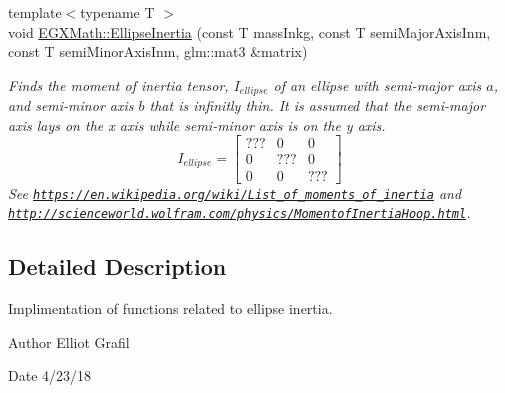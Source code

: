 \begin{DoxyCompactItemize}
{\footnotesize template$<$typename T $>$ }\\void \mbox{\hyperlink{group___e_g_x_math-_geometry-2_d-_ellipse-_inertia_gad679a65dc7550e27dc69c1d328c94732}{E\+G\+X\+Math\+::\+Ellipse\+Inertia}} (const T mass\+Inkg, const T semi\+Major\+Axis\+Inm, const T semi\+Minor\+Axis\+Inm, glm\+::mat3 \&matrix)
\begin{DoxyCompactList}\small\item\em Finds the moment of inertia tensor, $I_{ellipse}$ of an ellipse with semi-\/major axis $a$, and semi-\/minor axis $b$ that is infinitly thin. It is assumed that the semi-\/major axis lays on the x axis while semi-\/minor axis is on the y axis. \[ I_{ellipse}=\begin{bmatrix} ??? & 0 & 0\\ 0 & ??? & 0\\ 0 & 0 & ??? \end{bmatrix} \] See \href{https://en.wikipedia.org/wiki/List_of_moments_of_inertia}{\tt https\+://en.\+wikipedia.\+org/wiki/\+List\+\_\+of\+\_\+moments\+\_\+of\+\_\+inertia} and \href{http://scienceworld.wolfram.com/physics/MomentofInertiaHoop.html}{\tt http\+://scienceworld.\+wolfram.\+com/physics/\+Momentof\+Inertia\+Hoop.\+html}. \end{DoxyCompactList}\end{DoxyCompactItemize}


\subsection{Detailed Description}
Implimentation of functions related to ellipse inertia. 

\begin{DoxyAuthor}{Author}
Elliot Grafil 
\end{DoxyAuthor}
\begin{DoxyDate}{Date}
4/23/18 
\end{DoxyDate}
